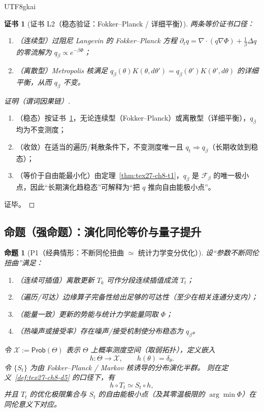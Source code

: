 \documentclass[12pt]{article}
\newtheorem{proposition}{命题}[section]
\newtheorem{Certificate}{证书}[section]
\begin{document}
\begin{CJK*}{UTF8}{gkai}
\begin{Certificate}[证书 L2（稳态验证：Fokker--Planck / 详细平衡）]
\label{cert:tex27-ch8-l2}
两条等价证书口径：
\begin{enumerate}
  \item（连续型）过阻尼 Langevin 的 Fokker--Planck 方程
  $
    \partial_t q=\nabla\cdot(q\nabla\Phi)+\frac{1}{\beta}\Delta q
  $
  的零流解为 $q_\beta\propto e^{-\beta\Phi}$；
  \item（离散型）Metropolis 核满足 $q_\beta(\theta)K(\theta,d\theta')=q_\beta(\theta')K(\theta',d\theta)$ 的详细平衡，从而 $q_\beta$ 不变。
\end{enumerate}
\end{Certificate}

\begin{proof}[证明（谓词因果链）]
\begin{enumerate}
  \item（稳态）按证书~\ref{cert:tex27-ch8-l2}，无论连续型（Fokker--Planck）或离散型（详细平衡），$q_\beta$ 均为不变测度；
  \item（收敛）在适当的遍历/耗散条件下，不变测度唯一且 $q_t\Rightarrow q_\beta$（长期收敛到稳态）；
  \item（等价于自由能最小化）由定理~\ref{thm:tex27-ch8-t1}，$q_\beta$ 是 $\mathcal{F}_\beta$ 的唯一极小点，因此“长期演化趋稳态”可解释为“把 $q$ 推向自由能极小点”。
\end{enumerate}
证毕。
\end{proof}

\subsection{命题（强命题）：演化同伦等价与量子提升}
\label{subsec:tex27-ch8-props}

\begin{proposition}[P1（经典情形：不断同伦扭曲 $\simeq$ 统计力学变分优化）]
\label{prop:tex27-ch8-p1}
设“参数不断同伦扭曲”满足：
\begin{enumerate}
  \item（连续可插值）离散更新 $T_{k}$ 可作分段连续插值成流 $T_t$；
  \item（遍历/可达）边缘算子完备性给出足够的可达性（至少在相关连通分支内）；
  \item（能量一致）更新的势能与统计力学能量同取 $\Phi$；
  \item（热噪声或接受率）存在噪声/接受机制使分布稳态为 $q_\beta$。
\end{enumerate}
令 $\mathcal{X}:=\mathsf{Prob}(\Theta)$ 表示 $\Theta$ 上概率测度空间（取弱拓扑），定义嵌入
\[
  h:\Theta\to\mathcal{X},\qquad h(\theta)=\delta_\theta.
\]
令 $\{S_t\}$ 为由 Fokker--Planck / Markov 核诱导的分布演化半群。
则在定义~\ref{def:tex27-ch8-d5} 的口径下，有
\[
  h\circ T_t \simeq S_t\circ h,
\]
并且 $T_t$ 的优化极限集合与 $S_t$ 的自由能极小点（及其零温极限的 $\arg\min\Phi$）在同伦意义下对应。
\end{proposition}


\end{CJK*}
\end{document}

